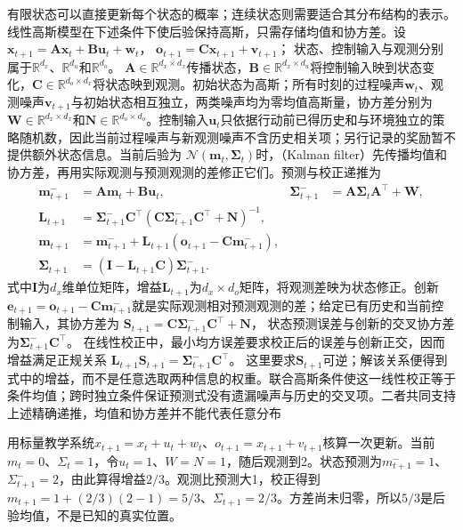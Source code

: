 有限状态可以直接更新每个状态的概率；连续状态则需要适合其分布结构的表示。线性高斯模型在下述条件下使后验保持高斯，只需存储均值和协方差。设
$\bm x_{t+1}=\bm A\bm x_t+\bm B\bm u_t+\bm w_t$，
$\bm o_{t+1}=\bm C\bm x_{t+1}+\bm v_{t+1}$；
状态、控制输入与观测分别属于$\mathbb R^{d_x}$、$\mathbb R^{d_u}$和$\mathbb R^{d_o}$。
$\bm A\in\mathbb R^{d_x\times d_x}$传播状态，$\bm B\in\mathbb R^{d_x\times d_u}$将控制输入映到状态变化，$\bm C\in\mathbb R^{d_o\times d_x}$将状态映到观测。初始状态为高斯；所有时刻的过程噪声$\bm w_t$、观测噪声$\bm v_{t+1}$与初始状态相互独立，两类噪声均为零均值高斯量，协方差分别为$\bm W\in\mathbb R^{d_x\times d_x}$和$\bm N\in\mathbb R^{d_o\times d_o}$。控制输入$\bm u_t$只依据行动前已得历史和与环境独立的策略随机数，因此当前过程噪声与新观测噪声不含历史相关项；另行记录的奖励暂不提供额外状态信息。当前后验为
$\mathcal N(\bm m_t,\bm\Sigma_t)$时，（Kalman filter）先传播均值和协方差，再用实际观测与预测观测的差修正它们。预测与校正递推为
\begin{align}
  \label{eq:rl-information-kalman}
  \bm m^-_{t+1}&=\bm A\bm m_t+\bm B\bm u_t,&
  \bm\Sigma^-_{t+1}&=\bm A\bm\Sigma_t\bm A^\top+\bm W,\nonumber\\
  \bm L_{t+1}&=\bm\Sigma^-_{t+1}\bm C^\top
     (\bm C\bm\Sigma^-_{t+1}\bm C^\top+\bm N)^{-1},\nonumber\\
  \bm m_{t+1}&=\bm m^-_{t+1}
       +\bm L_{t+1}(\bm o_{t+1}-\bm C\bm m^-_{t+1}),\nonumber\\
  \bm\Sigma_{t+1}&=(\bm I-\bm L_{t+1}\bm C)\bm\Sigma^-_{t+1}.
\end{align}
式中$\bm I$为$d_x$维单位矩阵，增益$\bm L_{t+1}$为$d_x\times d_o$矩阵，将观测差映为状态修正。创新$\bm e_{t+1}=\bm o_{t+1}-\bm C\bm m^-_{t+1}$就是实际观测相对预测观测的差；给定已有历史和当前控制输入，其协方差为
$\bm S_{t+1}=\bm C\bm\Sigma^-_{t+1}\bm C^\top+\bm N$，
状态预测误差与创新的交叉协方差为$\bm\Sigma^-_{t+1}\bm C^\top$。
在线性校正中，最小均方误差要求校正后的误差与创新正交，因而增益满足正规关系
$\bm L_{t+1}\bm S_{t+1}=\bm\Sigma^-_{t+1}\bm C^\top$。
这里要求$\bm S_{t+1}$可逆；解该关系便得到式中的增益，而不是任意选取两种信息的权重。联合高斯条件使这一线性校正等于条件均值；跨时独立条件保证预测式没有遗漏噪声与历史的交叉项。二者共同支持上述精确递推，均值和协方差并不能代表任意分布

\begin{example}[一次标量滤波]
  \label{ex:rl-information-kalman}
  用标量教学系统$x_{t+1}=x_t+u_t+w_t$、$o_{t+1}=x_{t+1}+v_{t+1}$核算一次更新。当前$m_t=0$、$\Sigma_t=1$，令$u_t=1$、$W=N=1$，随后观测到2。状态预测为$m^-_{t+1}=1$、$\Sigma^-_{t+1}=2$，由此算得增益$2/3$。观测比预测大1，校正得到$m_{t+1}=1+(2/3)(2-1)=5/3$、$\Sigma_{t+1}=2/3$。方差尚未归零，所以$5/3$是后验均值，不是已知的真实位置。
\end{example}

